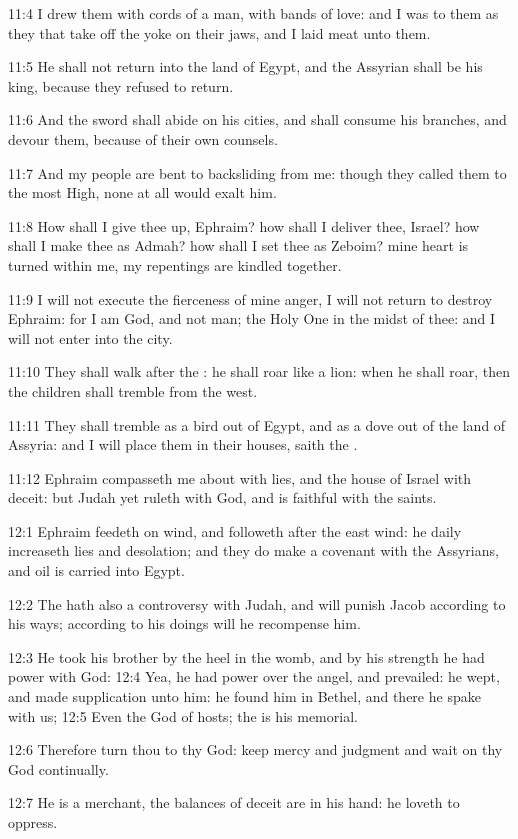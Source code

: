 11:4 I drew them with cords of a man, with bands of love: and I was to them as they that take off the yoke on their jaws, and I laid meat unto them.

11:5 He shall not return into the land of Egypt, and the Assyrian shall be his king, because they refused to return.

11:6 And the sword shall abide on his cities, and shall consume his branches, and devour them, because of their own counsels.

11:7 And my people are bent to backsliding from me: though they called them to the most High, none at all would exalt him.

11:8 How shall I give thee up, Ephraim? how shall I deliver thee, Israel?  how shall I make thee as Admah? how shall I set thee as Zeboim? mine heart is turned within me, my repentings are kindled together.

11:9 I will not execute the fierceness of mine anger, I will not return to destroy Ephraim: for I am God, and not man; the Holy One in the midst of thee: and I will not enter into the city.

11:10 They shall walk after the \LORD: he shall roar like a lion: when he shall roar, then the children shall tremble from the west.

11:11 They shall tremble as a bird out of Egypt, and as a dove out of the land of Assyria: and I will place them in their houses, saith the \LORD.

11:12 Ephraim compasseth me about with lies, and the house of Israel with deceit: but Judah yet ruleth with God, and is faithful with the saints.

12:1 Ephraim feedeth on wind, and followeth after the east wind: he daily increaseth lies and desolation; and they do make a covenant with the Assyrians, and oil is carried into Egypt.

12:2 The \LORD hath also a controversy with Judah, and will punish Jacob according to his ways; according to his doings will he recompense him.

12:3 He took his brother by the heel in the womb, and by his strength he had power with God: 12:4 Yea, he had power over the angel, and prevailed: he wept, and made supplication unto him: he found him in Bethel, and there he spake with us; 12:5 Even the \LORD God of hosts; the \LORD is his memorial.

12:6 Therefore turn thou to thy God: keep mercy and judgment and wait on thy God continually.

12:7 He is a merchant, the balances of deceit are in his hand: he loveth to oppress.

